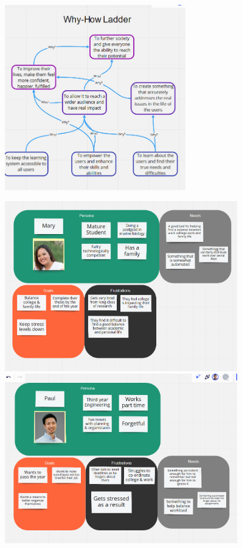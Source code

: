 \documentclass{article}
\begin{document}
		\begin{figure}[h!]
			\centering
			\includegraphics[width=0.7\textwidth]{whyhowladder.jpg}
		\end{figure}
		\newpage
		\begin{figure}[h!]
			\begin{minipage}{0.5\linewidth}
				\centering
				\includegraphics[width=0.9\textwidth]{userpersona1.jpg}
			\end{minipage}%
			\begin{minipage}{0.5\linewidth}
				\centering
				\includegraphics[width=0.9\textwidth]{userpersona2.jpg}
			\end{minipage}
		\end{figure}
\end{document}

